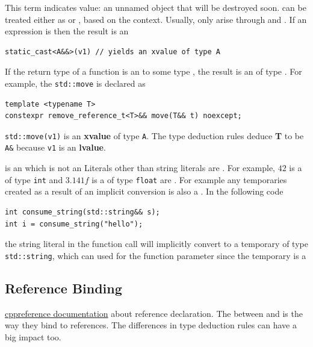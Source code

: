 This term indicates  value: an unnamed object that 
will be destroyed soon.  can be treated either as 
 or , based on the context.
\newline
Usually,  only arise through  and 
. If an expression is  then the result is an  
\begin{lstlisting}[language=C+++]
static_cast<A&&>(v1) // yields an xvalue of type A
\end{lstlisting}
If the return type of a function is an  to some 
type , the result is an  of type .
For example, the \texttt{std::move} is declared as
\begin{lstlisting}[language=C+++]
template <typename T>
constexpr remove_reference_t<T>&& move(T&& t) noexcept;
\end{lstlisting}
\texttt{std::move(v1)} is an \textbf{xvalue} of type \texttt{A}. 
The type deduction rules deduce \textbf{T} to be \texttt{A\&} 
because \texttt{v1} is an \textbf{lvalue}.

  is an  
which is not an 
\newline
Literals other than string literals are . For example, 
$42$ is a  of type \texttt{int} and $3.141f$ is a 
 of type \texttt{float}
\newline
{} are . For example any temporaries 
created as a result of an implicit conversion is also a . 
In the following code
\begin{lstlisting}[language=C+++]
int consume_string(std::string&& s);
int i = consume_string("hello");
\end{lstlisting}
the string literal in the function call will implicitly convert to a 
temporary of type 
\newline 
\texttt{std::string}, which can  used for the function parameter since the temporary is a 

\subsection{Reference Binding}
\href{https://en.cppreference.com/w/cpp/language/reference}{cppreference documentation} 
about reference declaration.
\newline
The  between  and  is 
the way they bind to references. The differences in type deduction rules 
can have a big impact too.

